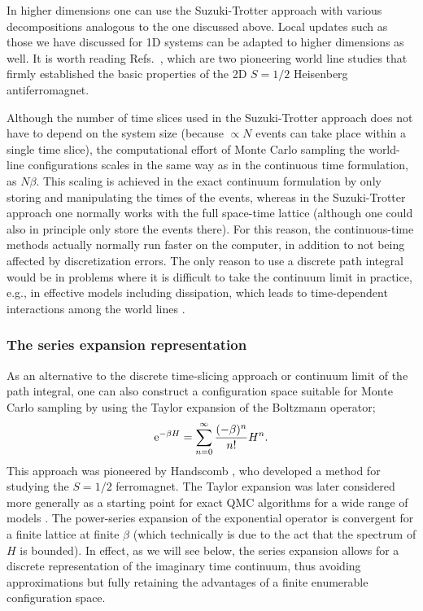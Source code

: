 \documentclass[draft,numberedheadings]{aipproc}
\begin{document}
In higher dimensions one can use the Suzuki-Trotter approach with various decompositions analogous to the one discussed above. Local updates such as those
we have discussed for 1D systems can be adapted to higher dimensions as well. It is worth reading Refs.~\cite{reger88,makivic91}, which are two 
pioneering world line studies that firmly established the basic properties of the 2D $S=1/2$ Heisenberg antiferromagnet.

Although the number of time slices used in the Suzuki-Trotter approach does not have to depend on the system size (because $\propto N$ events can take place within
a single time slice), the computational effort of Monte Carlo sampling the world-line configurations scales in the same way as in the continuous time formulation, 
as $N\beta$. This scaling is achieved in the exact continuum formulation by only storing and manipulating the times of the events, whereas in the Suzuki-Trotter 
approach one normally works with the full space-time lattice (although one could also in principle only store the events there). For this reason, the continuous-time 
methods actually normally run faster on the computer, in addition to not being affected by discretization errors. The only reason to use a discrete path integral 
would be in problems where it is difficult to take the continuum limit in practice, e.g., in effective models including dissipation, which leads to time-dependent 
interactions among the world lines \cite{werner05}.

\subsubsection{The series expansion representation}
\label{sec_sseformulation}

As an alternative to the discrete time-slicing approach or continuum limit of the path integral, one can also construct a configuration space suitable for 
Monte Carlo sampling by using the Taylor expansion of the Boltzmann operator;
\begin{equation}
{\rm e}^{-\beta H} = \sum_{n=0}^\infty \frac{(-\beta)^n}{n!}H^n.
\end{equation}
This approach was pioneered by Handscomb \cite{handscomb62,handscomb64}, who developed a method for studying the $S=1/2$ ferromagnet. The Taylor expansion was 
later considered more generally as a starting point for exact QMC algorithms for a wide range of models \cite{lyklema82,chakravarty82,sandvik90,sandvik92}. 
The power-series expansion of the exponential operator is convergent for a finite lattice at finite $\beta$ (which technically is due to the act that the 
spectrum of $H$ is bounded). In effect, as we will see below, the series expansion allows for a discrete representation of the imaginary time continuum, thus avoiding 
approximations but fully retaining the advantages of a finite enumerable configuration space.
\end{document}
